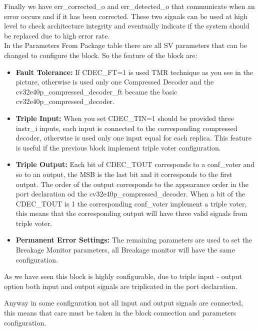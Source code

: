 {    	 Finally we have err\_corrected\_o and err\_detected\_o that communicate when an error occurs and if it has been corrected.
    	 These two signals can be used at high level to check architecture integrity and eventually indicate if the system should be replaced due to high error rate.\\
    	 
    	 In the Parameters From Package table there are all SV parameters that can be changed to configure the block. So the feature of the block are:
    	 \begin{itemize}
    	     \item \textbf{Fault Tolerance:} If CDEC\_FT=1 is used TMR technique as you see in the picture, otherwise is used only one Compressed Decoder and the cv32e40p\_compressed\_decoder\_ft became the basic cv32e40p\_compressed\_decoder.
    	     \item \textbf{Triple Input:} When you set CDEC\_TIN=1 should be provided three instr\_i inputs, each input is connected to the corresponding compressed decoder, otherwise is used only one input equal for each replica. This feature is useful if the previous block implement triple voter configuration. 
    	     \item \textbf{Triple Output:} Each bit of CDEC\_TOUT corresponds to a conf\_voter and so to an output, the MSB is the last bit and it corresponds to the first output. The order of the output corresponds to the appearance order in the port declaration od the cv32e40p\_compressed\_decoder. When a bit of the CDEC\_TOUT is 1 the corresponding conf\_voter implement a triple voter, this means that the corresponding output will have three valid signals from triple voter.
    	     \item \textbf{Permanent Error Settings:} The remaining parameters are used to set the Breakage Monitor parameters, all Breakage monitor will have the same configuration.
    	 \end{itemize}
    	 
    	 As we have seen this block is highly configurable, due to triple input - output option both input and output signals are triplicated in the port declaration. 
    	 
    	 Anyway in some configuration not all input and output signals are connected, this means that care must be taken in the block connection and parameters configuration.
	    
	
}